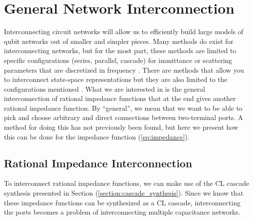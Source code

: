 
\section{General Network Interconnection}\label{section:general_network_interconnection}
Interconnecting circuit networks will allow us to efficiently build large models of qubit networks out of smaller and simpler pieces. Many methods do exist for interconnecting networks, but for the most part, these methods are limited to specific configurations (series, parallel, cascade) for immittance or scattering parameters that are discretized in frequency \cite[Chapter 3.3]{newcomb}. There are methods that allow you to interconnect state-space representations but they are also limited to the configurations mentioned \cite[Chapter 3.7.1]{passive_macromodeling}. What we are interested in is the general interconnection of rational impedance functions that at the end gives another rational impedance function. By ``general'', we mean that we want to be able to pick and choose arbitrary and direct connections between two-terminal ports. A method for doing this has not previously been found, but here we present how this can be done for the impedance function (\ref{eq:impedance}).

\subsection{Rational Impedance Interconnection}\label{section:rational_impedance_interconnection}
To interconnect rational impedance functions, we can make use of the CL cascade synthesis presented in Section (\ref{section:cascade_synthesis}). Since we know that these impedance functions can be synthesized as a CL cascade, interconnecting the ports becomes a problem of interconnecting multiple capacitance networks.

